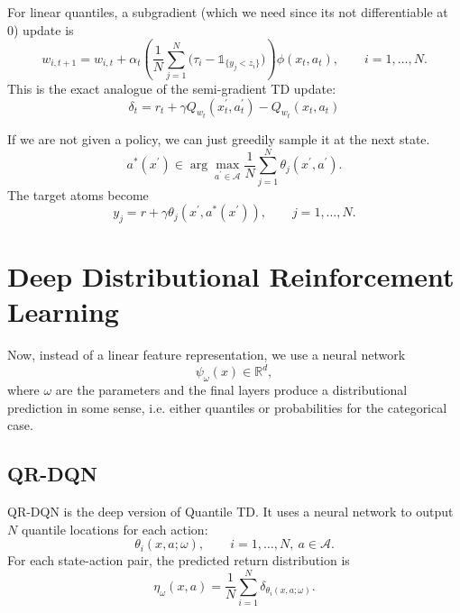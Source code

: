 \documentclass[12pt]{article}
\newcommand{\R}{\mathbb{R}}
\newcommand{\1}{\mathds{1}}
\newcommand{\A}{\mathcal{A}}
\begin{document}
For linear quantiles, a subgradient (which we need since its not differentiable at 0) update is
$$
  w_{i,t+1}
  =
  w_{i,t}
  +
  \alpha_t
  \left(
    \frac{1}{N}\sum_{j=1}^N
    \bigl(\tau_i-\1_{\{y_j < z_i\}}\bigr)
  \right)
  \phi(x_t,a_t),
  \qquad i=1,\ldots,N.
$$
This is the exact analogue of the semi-gradient TD update:
$$
  \delta_t
  =
  r_t+\gamma Q_{w_t}(x^{\prime}_t,a^{\prime}_t)-Q_{w_t}(x_t,a_t)
$$

If we are not given a policy, we can just greedily sample it at the next state.
$$
  a^*(x^{\prime})
  \in
  \arg\max_{a^{\prime}\in\A}
  \frac{1}{N}\sum_{j=1}^N \theta_j(x^{\prime},a^{\prime}).
$$
The target atoms become
$$
  y_j=r+\gamma\theta_j(x^{\prime},a^*(x^{\prime})),
  \qquad j=1,\ldots,N.
$$

\section{Deep Distributional Reinforcement Learning}

Now, instead of a linear feature representation, we use a neural network
$$
  \psi_\omega(x)\in\R^d,
$$
where $\omega$ are the parameters and the final layers produce a distributional prediction in some sense, i.e. either quantiles or probabilities for the categorical case. \\

\subsection{QR-DQN}

QR-DQN is the deep version of Quantile TD. It
uses a neural network to output $N$ quantile locations for each action:
$$
  \theta_i(x,a;\omega),
  \qquad i=1,\ldots,N,\ a\in\A.
$$
For each state-action pair, the predicted return distribution is
$$
  \eta_\omega(x,a)
  =
  \frac{1}{N}\sum_{i=1}^N
  \delta_{\theta_i(x,a;\omega)}.
$$
\end{document}
